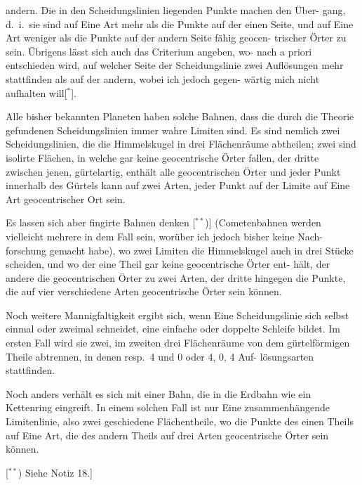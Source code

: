 \documentclass[12pt,a4paper]{article}
\begin{document}
\newpage

andern. Die in den Scheidungslinien liegenden Punkte machen den \"Uber-
gang, d.~i.~sie sind auf Eine Art mehr als die Punkte auf der einen Seite,
und auf Eine Art weniger als die Punkte auf der andern Seite f\"ahig geocen-
trischer \"Orter zu sein. \"Ubrigens l\"asst sich auch das Criterium angeben, wo-
nach a priori entschieden wird, auf welcher Seite der Scheidungslinie zwei
Aufl\"osungen mehr stattfinden als auf der andern, wobei ich jedoch gegen-
w\"artig mich nicht aufhalten will[$^*$].

Alle bisher bekannten Planeten haben solche Bahnen, dass die durch die
Theorie gefundenen Scheidungslinien immer wahre Limiten sind. Es sind
nemlich zwei Scheidungslinien, die die Himmelskugel in drei Fl\"achenr\"aume
abtheilen; zwei sind isolirte Fl\"achen, in welche gar keine geocentrische \"Orter
fallen, der dritte zwischen jenen, g\"urtelartig, enth\"alt alle geocentrischen \"Orter
und jeder Punkt innerhalb des G\"urtels kann auf zwei Arten, jeder Punkt
auf der Limite auf Eine Art geocentrischer Ort sein.

Es lassen sich aber fingirte Bahnen denken [$^{**}$)] (Cometenbahnen werden
vielleicht mehrere in dem Fall sein, wor\"uber ich jedoch bisher keine Nach-
forschung gemacht habe), wo zwei Limiten die Himmelskugel auch in drei
St\"ucke scheiden, und wo der eine Theil gar keine geocentrische \"Orter ent-
h\"alt, der andere die geocentrischen \"Orter zu zwei Arten, der dritte hingegen
die Punkte, die auf vier verschiedene Arten geocentrische \"Orter sein k\"onnen.

Noch weitere Mannigfaltigkeit ergibt sich, wenn Eine Scheidungslinie sich
selbst einmal oder zweimal schneidet, eine einfache oder doppelte Schleife
bildet. Im ersten Fall wird sie zwei, im zweiten drei Fl\"achenr\"aume von dem
g\"urtelf\"ormigen Theile abtrennen, in denen resp.~4 und 0 oder 4, 0, 4 Auf-
l\"osungsarten stattfinden.

Noch anders verh\"alt es sich mit einer Bahn, die in die Erdbahn wie ein
Kettenring eingreift. In einem solchen Fall ist nur Eine zusammenh\"angende
Limitenlinie, also zwei geschiedene Fl\"achentheile, wo die Punkte des einen
Theils auf Eine Art, die des andern Theils auf drei Arten geocentrische \"Orter
sein k\"onnen.

\begin{flushright}

[$^{**}$) Siehe Notiz 18.]
\end{flushright}
\end{document}
